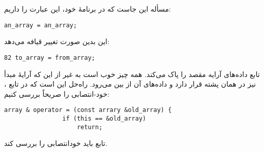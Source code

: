 \section{}
\paragraph{}\label{answer:75}
مسأله این جاست که در برنامهٔ خود، این عبارت را داریم:
\begin{LTR}
        \begin{lstlisting}[style=C++Style]
            an_array = an_array;
        \end{lstlisting}
\end{LTR}

این بدین صورت تغییر قیافه می‌دهد:
\begin{LTR}
        \begin{lstlisting}[style=C++Style]
            82 to_array = from_array;
        \end{lstlisting}
\end{LTR}

تابع  داده‌های آرایه مقصد را پاک می‌کند. همه چیز خوب است به غیر از این که آرایهٔ مبدأ نیز در همان پشته قرار دارد و داده‌های آن از بین می‌رود. راه‌حل این است که در تابع ، خود-انتصابی را صریحاً بررسی کنیم:
\begin{LTR}
        \begin{lstlisting}[style=C++Style]
            array & operator = (const arrary &old_array) {
                if (this == &old_array)
                    return;
        \end{lstlisting}
\end{LTR}

تابع  باید خودانتصابی را بررسی کند.